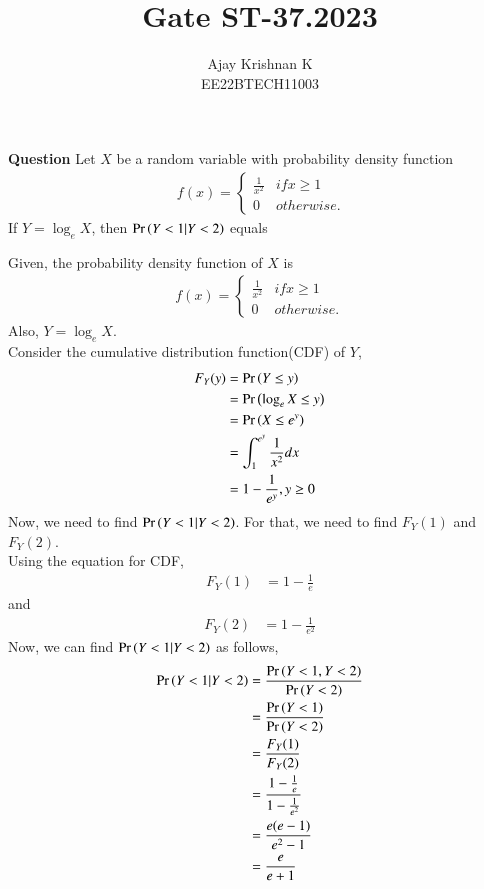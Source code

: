 \documentclass[journal,11pt]{IEEEtran}
\begin{document}
\vspace{3cm}
\author{Ajay Krishnan K\\EE22BTECH11003}

\title{Gate ST-37.2023}
\maketitle

\textbf{Question}
Let $X$ be a random variable with probability density function
\begin{align}\
    f(x) = \begin{cases}
        \frac{1}{x^2} & if x \geq 1\\
        0  & otherwise.
        \end{cases}
\end{align}
If $Y = \log_e X$, then $\Pr\left(Y<1 | Y<2 \right)$ equals

\solution
Given, the probability density function of $X$ is
\begin{align}
    f(x) = \begin{cases}
        \frac{1}{x^2} & if x \geq 1\\
        0  & otherwise.
        \end{cases}
\end{align}
Also, $Y = \log_e X$.\\
Consider the cumulative distribution function(CDF) of $Y$,
\begin{align}
    F_Y(y) &= \Pr\left(Y \leq y\right)\\
    &= \Pr\left(\log_e X \leq y\right)\\
    &= \Pr\left(X \leq e^y\right)\\
    &= \int_{1}^{e^y} \frac{1}{x^2} dx\\
    &= 1 - \frac{1}{e^y} , y \geq 0
\end{align}
Now, we need to find $\Pr\left(Y<1 | Y<2 \right)$.
For that, we need to find $F_Y(1)$ and $F_Y(2)$.\\
Using the equation for CDF,
\begin{align}
    F_Y(1) &= 1 - \frac{1}{e}
\end{align}
and
\begin{align}
    F_Y(2) &= 1 - \frac{1}{e^2}
\end{align}
Now, we can find $\Pr\left(Y<1 | Y<2 \right)$ as follows,
\begin{align}
    \Pr\left(Y<1 | Y<2 \right) &= \frac{\Pr\left(Y<1 , Y<2\right)}{\Pr\left(Y<2\right)}\\
    &= \frac{\Pr\left(Y<1\right)}{\Pr\left(Y<2\right)}\\
    &= \frac{F_Y(1)}{F_Y(2)}\\
    &= \frac{1 - \frac{1}{e}}{1 - \frac{1}{e^2}}\\
    &= \frac{e(e-1)}{e^2-1}\\
    &= \frac{e}{e+1}
\end{align}
\end{document}

